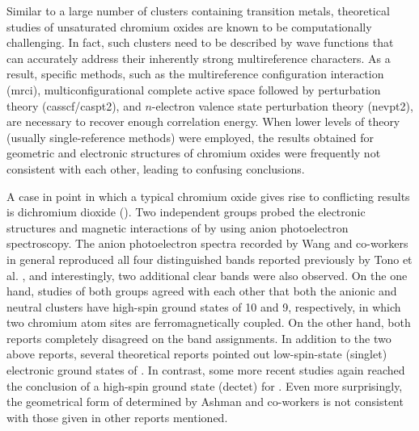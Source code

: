 \begin{refsection}
Similar to a large number of clusters containing transition metals, theoretical studies of unsaturated chromium oxides are known to be computationally challenging. In fact, such clusters need to be described by wave functions that can accurately address their inherently strong multireference characters. As a result, specific methods, such as the multireference configuration interaction (\acrshort{mrci}), multiconfigurational complete active space followed by perturbation theory (\acrshort{casscf}/\acrshort{caspt2}), and $n$-electron valence state perturbation theory (\acrshort{nevpt2}), are necessary to recover enough correlation energy. When lower levels of theory (usually single-reference methods) were employed, the results obtained for geometric and electronic structures of chromium oxides were frequently not consistent with each other, leading to confusing conclusions. \cite{Tono2003B, Tono2003, Reddy99, GutsevCr2On, wang10, Veliah98, Zhai06, Li07}  




A case in point in which a typical chromium oxide gives rise to conflicting results is dichromium dioxide (). Two independent groups probed the electronic structures and magnetic interactions of  by using anion photoelectron spectroscopy. \cite{Zhai06, Tono2003B} The anion photoelectron spectra recorded by Wang and co-workers\cite{Zhai06} in general reproduced all four distinguished bands reported previously by Tono et al. \cite{Tono2003B}, and interestingly, two additional clear bands were also observed. \cite{Tono2003B, Zhai06} On the one hand, studies of both groups agreed with each other that both the anionic and neutral clusters  have high-spin ground states of 10 and 9, respectively, in which two chromium atom sites are ferromagnetically coupled. On the other hand, both reports completely disagreed on the band assignments. In addition to the two above reports, several theoretical reports pointed out low-spin-state (singlet) electronic ground states of . \cite{wang10, GutsevCr2On, Reddy00, Veliah98} In contrast, some more recent studies again reached the conclusion of a high-spin ground state (dectet) for . \cite{paul09, GutsevCr2On} Even more surprisingly, the geometrical form of  determined by Ashman and co-workers \cite{Reddy00}  is not consistent with those given in other reports mentioned. \cite{wang10, GutsevCr2On, Reddy00, Veliah98, Tono2003B}  



\end{refsection}
